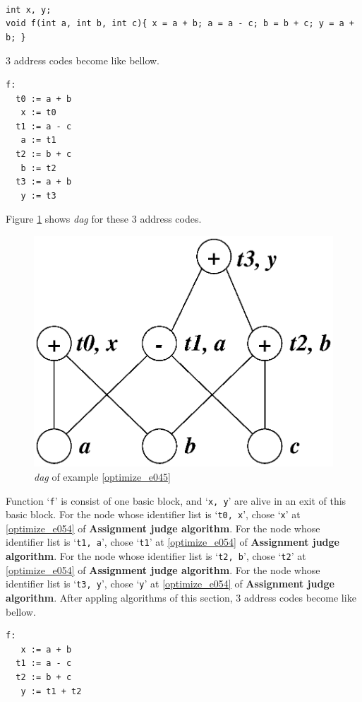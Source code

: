 \begin{Example}
\label{optimize_e045}
\begin{verbatim}

int x, y;
void f(int a, int b, int c){ x = a + b; a = a - c; b = b + c; y = a + b; }
\end{verbatim}
3 address codes become like bellow.
\begin{verbatim}
f:
  t0 := a + b
   x := t0
  t1 := a - c
   a := t1
  t2 := b + c
   b := t2
  t3 := a + b
   y := t3
\end{verbatim}
Figure \ref{optimize_e046} shows {\em dag} for these 3 address codes.
\begin{figure}[htbp]
\begin{center}
\includegraphics[width=0.7\linewidth,height=0.540\linewidth]{opt024.eps}
\caption{{\em dag} of example \ref{optimize_e045}}
\label{optimize_e046}
\end{center}
\end{figure}
Function `{\tt{f}}' is consist of one basic block, and 
`{\tt{x, y}}' are alive in an exit of this basic block.
For the node whose identifier list is `{\tt{t0, x}}',
chose `{\tt{x}}' at \ref{optimize_e054} of {\bf Assignment judge algorithm}.
For the node whose identifier list is `{\tt{t1, a}}',
chose `{\tt{t1}}' at \ref{optimize_e054} of {\bf Assignment judge algorithm}.
For the node whose identifier list is `{\tt{t2, b}}',
chose `{\tt{t2}}' at \ref{optimize_e054} of {\bf Assignment judge algorithm}.
For the node whose identifier list is `{\tt{t3, y}}',
chose `{\tt{y}}' at \ref{optimize_e054} of {\bf Assignment judge algorithm}.
After appling algorithms of this section,
3 address codes become like bellow.
\begin{verbatim}
f:
   x := a + b
  t1 := a - c
  t2 := b + c
   y := t1 + t2
\end{verbatim}
\end{Example}

